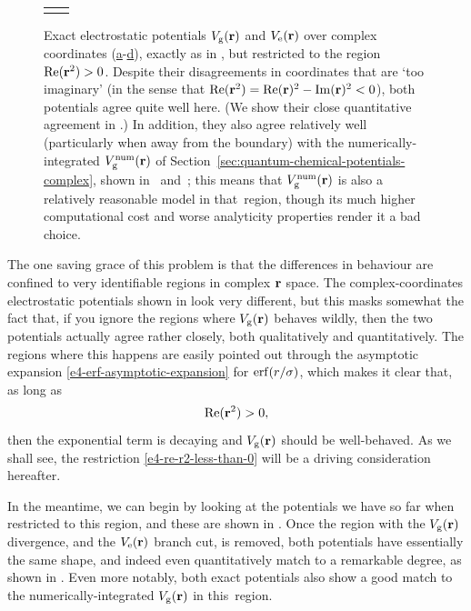 \begin{figure}[!htbp]
\begin{tabular}{cc}
{  }
  \end{tabular}
  \caption[Electrostatic potentials $\Vg(\vbr)$, $\Ve(\vbr)$ and $\Vgnum(\vbr)$ over complex coordinates restricted to $\Re(\vbr^2)>0$]{
  Exact electrostatic potentials $\Vg(\vbr)$ and $\Ve(\vbr)$ over complex coordinates (\hyperref[f4-potentials-comparison-restricted-complex-coordinates-a]{a}-\hyperref[f4-potentials-comparison-restricted-complex-coordinates-d]{d}), exactly as in , but restricted to the region $\Re(\vbr^2)>0$. Despite their disagreements in coordinates that are `too imaginary' (in the sense that $\Re(\vb{r}^2)=\Re(\vb{r})^2-\Im(\vb{r})^2<0$), both potentials agree quite well here. (We show their close quantitative agreement in .) In addition, they also agree relatively well (particularly when away from the boundary) with the numerically-integrated $\Vgnum(\vbr)$ of Section~\ref{sec:quantum-chemical-potentials-complex}, shown in~ and~; this means that $\Vgnum(\vbr)$ is also a relatively reasonable model in that~region, though its much higher computational cost and worse analyticity properties render it a bad choice.}
  \label{f4-potentials-comparison-restricted-complex-coordinates}
\end{figure}


The one saving grace of this problem is that the differences in behaviour are confined to very identifiable regions in complex $\vb{r}$ space. The complex-coordinates electrostatic potentials shown in  look very different, but this masks somewhat the fact that, if you ignore the regions where $\Vg(\vbr)$ behaves wildly, then the two potentials actually agree rather closely, both qualitatively and quantitatively. The regions where this happens are easily pointed out through the asymptotic expansion \eqref{e4-erf-asymptotic-expansion} for $\erf(r/\sigma)$, which makes it clear that, as long as
%
\begin{equation}
\Re(\vb{r}^2)>0,
\label{e4-re-r2-less-than-0}
\end{equation}
%
then the exponential term is decaying and $\Vg(\vbr)$ should be well-behaved. As we shall see, the restriction \eqref{e4-re-r2-less-than-0} will be a driving consideration hereafter.

In the meantime, we can begin by looking at the potentials we have so far when restricted to this region, and these are shown in . Once the region with the $\Vg(\vbr)$ divergence, and the $\Ve(\vbr)$ branch cut, is removed, both potentials have essentially the same shape, and indeed even quantitatively match to a remarkable degree, as shown in . Even more notably, both exact potentials also show a good match to the numerically-integrated $\Vg(\vbr)$ in this~region.



